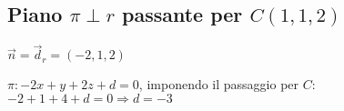 \subsection{Piano $\pi \perp r$ passante per $C(1, 1, 2)$}
$\vec{n} = \vec{d}_r = (-2, 1, 2)$

$\pi: -2x + y +2z + d = 0$, imponendo il passaggio per $C$:
$-2 + 1 + 4 + d = 0 \Rightarrow d = -3$
